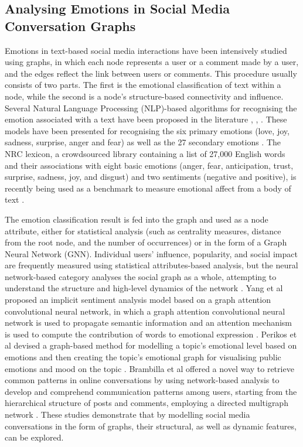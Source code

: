 \documentclass[acmtog]{acmart}
\begin{document}
\subsection{Analysing Emotions in Social Media Conversation Graphs}
Emotions in text-based social media interactions have been intensively studied using graphs, in which each node represents a user or a comment made by a user, and the edges reflect the link between users or comments. This procedure usually consists of two parts. The first is the emotional classification of text within a node, while the second is a node's structure-based connectivity and influence. Several Natural Language Processing (NLP)-based algorithms for recognising the emotion associated with a text have been proposed in the literature \cite{poria2019emotion}, \cite{chowanda2021exploring}, \cite{majumder2019dialoguernn}. These models have been presented for recognising the six primary emotions (love, joy, sadness, surprise, anger and fear) as well as the 27 secondary emotions \cite{shaver1987emotion}. The NRC lexicon, a crowdsourced library containing a list of 27,000 English words and their associations with eight basic emotions (anger, fear, anticipation, trust, surprise, sadness, joy, and disgust) and two sentiments (negative and positive), is recently being used as a benchmark to measure emotional affect from a body of text \cite{mohammad2013crowdsourcing}.

The emotion classification result is fed into the graph and used as a node attribute, either for statistical analysis (such as centrality measures, distance from the root node, and the number of occurrences) or in the form of a Graph Neural Network (GNN). Individual users' influence, popularity, and social impact are frequently measured using statistical attributes-based analysis, but the neural network-based category analyses the social graph as a whole, attempting to understand the structure and high-level dynamics of the network \cite{antonakaki2021survey}. Yang et al proposed an implicit sentiment analysis model based on a graph attention convolutional neural network, in which a graph attention convolutional neural network is used to propagate semantic information and an attention mechanism is used to compute the contribution of words to emotional expression \cite{yang2022implicit}. Perikos et al devised a graph-based method for modelling a topic's emotional level based on emotions and then creating the topic's emotional graph for visualising public emotions and mood on the topic \cite{perikos2018framework}. Brambilla et al offered a novel way to retrieve common patterns in online conversations by using network-based analysis to develop and comprehend communication patterns among users, starting from the hierarchical structure of posts and comments, employing a directed multigraph network \cite{brambilla2021conversation}. These studies demonstrate that by modelling social media conversations in the form of graphs, their structural, as well as dynamic features, can be explored.
\end{document}
